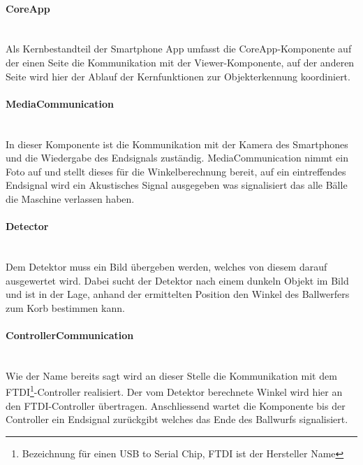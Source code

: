		\paragraph{CoreApp}$~~$\vspace{2mm}\\
		Als Kernbestandteil der Smartphone App umfasst die CoreApp-Komponente auf der einen Seite die Kommunikation mit der Viewer-Komponente, auf der anderen Seite wird hier der Ablauf der Kernfunktionen zur Objekterkennung koordiniert.		
		
		\paragraph{MediaCommunication}$~~$\vspace{2mm}\\
		In dieser Komponente ist die Kommunikation mit der Kamera des Smartphones und die Wiedergabe des Endsignals zuständig. MediaCommunication nimmt ein Foto auf und stellt dieses für die Winkelberechnung bereit, auf ein eintreffendes Endsignal wird ein Akustisches Signal ausgegeben was signalisiert das alle Bälle die Maschine verlassen haben.
		
		\paragraph{Detector}$~~$\vspace{2mm}\\
		Dem Detektor muss ein Bild übergeben werden, welches von diesem darauf ausgewertet wird. Dabei sucht der Detektor nach einem dunkeln Objekt im Bild und ist in der Lage, anhand der ermittelten Position den Winkel des Ballwerfers zum Korb bestimmen kann.
		

		\paragraph{ControllerCommunication}$~~$\vspace{2mm}\\
		Wie der Name bereits sagt wird an dieser Stelle die Kommunikation mit dem FTDI\footnote{Bezeichnung für einen USB to Serial Chip, FTDI ist der Hersteller Name}-Controller realisiert. Der vom Detektor berechnete Winkel wird hier an den FTDI-Controller übertragen. Anschliessend wartet die Komponente bis der Controller ein Endsignal zurückgibt welches das Ende des Ballwurfs signalisiert.
		
